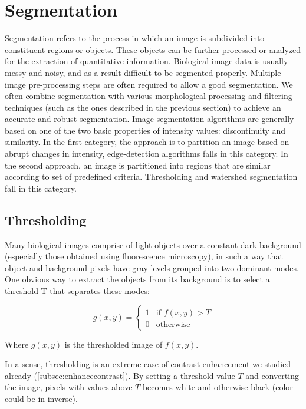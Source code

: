 
\section{Segmentation}
\label{sec:segmentation}

Segmentation refers to the process in which an image is subdivided into
constituent regions or objects. These objects can be further
processed or analyzed for the extraction of quantitative information.
Biological image data is usually messy and noisy, and as a result
difficult to be segmented properly. Multiple image pre-processing steps are
often required to allow a good segmentation. We often combine segmentation
with various morphological processing and filtering techniques (such as the ones described in the previous section) to achieve an accurate and robust
segmentation.
Image segmentation algorithms are generally based on one of the two basic
properties of intensity values: discontinuity and similarity. In the
first category, the approach is to partition an image based on abrupt
changes in intensity, edge-detection algorithms falls in this category. In the second approach, an image is partitioned into
regions that are similar according to set of predefined criteria.
Thresholding and watershed segmentation fall in this category.

\subsection{Thresholding}
\label{sec:Thresholding}
Many biological images comprise of light objects over a constant dark
background (especially those obtained using fluorescence microscopy),
in such a way that object and background pixels have gray levels
grouped into two dominant modes. One obvious way to extract the objects
from its background is to select a threshold T that separates these
modes:

\begin{equation}
g(x,y)= 
\begin{cases}
1 & \text{if $f(x, y) > T$}\\
0 & \text{otherwise}
\end{cases}
\end{equation}

Where $g(x,y)$ is the thresholded image of
$f(x,y)$.

In a sense, thresholding is an extreme case of contrast enhancement we
studied already (\ref{subsec:enhancecontrast}). By setting a threshold value $T$ and
converting the image, pixels with values above $T$ becomes white and
otherwise black (color could be in inverse). 

